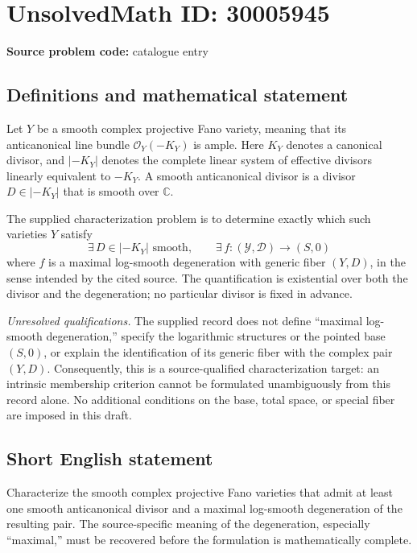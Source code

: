 \documentclass[11pt]{article}
\newcommand{\C}{\mathbb{C}}
\begin{document}
\section*{UnsolvedMath ID: 30005945}
\textbf{Source problem code:} catalogue entry
\subsection{Definitions and mathematical statement}
Let \(Y\) be a smooth complex projective Fano variety, meaning that its anticanonical line bundle \(\mathcal O_Y(-K_Y)\) is ample. Here \(K_Y\) denotes a canonical divisor, and \(|-K_Y|\) denotes the complete linear system of effective divisors linearly equivalent to \(-K_Y\). A smooth anticanonical divisor is a divisor \(D\in|-K_Y|\) that is smooth over \(\C\).

The supplied characterization problem is to determine exactly which such varieties \(Y\) satisfy
\[
\exists\,D\in|-K_Y|\text{ smooth},\qquad
\exists\,f:(\mathcal Y,\mathcal D)\longrightarrow(S,0)
\]
where \(f\) is a maximal log-smooth degeneration with generic fiber \((Y,D)\), in the sense intended by the cited source. The quantification is existential over both the divisor and the degeneration; no particular divisor is fixed in advance.

\emph{Unresolved qualifications.} The supplied record does not define ``maximal log-smooth degeneration,'' specify the logarithmic structures or the pointed base \((S,0)\), or explain the identification of its generic fiber with the complex pair \((Y,D)\). Consequently, this is a source-qualified characterization target: an intrinsic membership criterion cannot be formulated unambiguously from this record alone. No additional conditions on the base, total space, or special fiber are imposed in this draft.
\subsection{Short English statement}
Characterize the smooth complex projective Fano varieties that admit at least one smooth anticanonical divisor and a maximal log-smooth degeneration of the resulting pair. The source-specific meaning of the degeneration, especially ``maximal,'' must be recovered before the formulation is mathematically complete.
\end{document}
